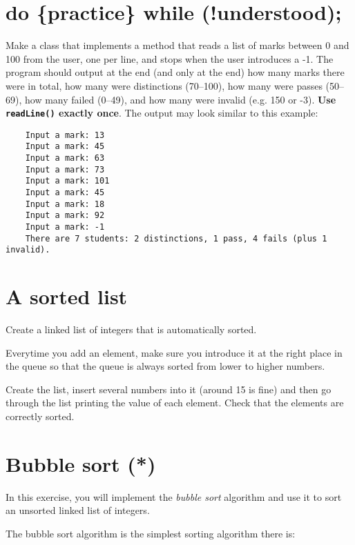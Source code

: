 \documentclass{article}
\begin{document}
\section{do \{practice\} while (!understood);}
\label{sec:do-practice-while}

Make a class that implements a method 
that reads a list of marks between 0 and 100 from the
user, one per line, and stops when the user introduces a -1. The
program should output at the end (and only at the end) how many marks
there were in total, how many were distinctions (70--100), how many
were passes (50--69), how many failed (0--49), and how many were
invalid (e.g. 150 or -3). \textbf{Use \texttt{readLine()} exactly once}. The
output may look similar to this example: 

\begin{verbatim}
    Input a mark: 13
    Input a mark: 45
    Input a mark: 63
    Input a mark: 73
    Input a mark: 101
    Input a mark: 45
    Input a mark: 18
    Input a mark: 92
    Input a mark: -1
    There are 7 students: 2 distinctions, 1 pass, 4 fails (plus 1 invalid). 
\end{verbatim}

\section{A sorted list}
\label{sec:sorted-list}

Create a linked list of integers that is automatically sorted. 

Everytime you add an element, make sure you introduce it at the right
place in the queue so that the queue is always sorted from lower to
higher numbers. 

Create the list, insert several numbers into it (around 15 is fine)
and then go through the list printing the value of each element. Check
that the elements are correctly sorted.


\section{Bubble sort (*)}
\label{sec:bubble-sort}

In this exercise, you will implement the \emph{bubble sort} algorithm
and use it to sort an unsorted linked list of integers. 

The bubble sort algorithm is the simplest sorting algorithm there is: 
\end{document}

